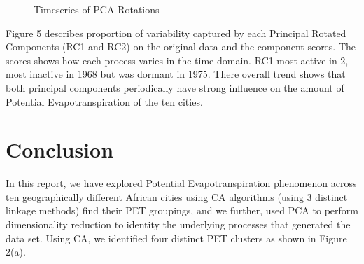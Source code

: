 \documentclass[12pt,a4paper]{article}
\begin{document}
\begin{figure}[t!ph]
\caption{Timeseries of PCA Rotations} \label{fig2}
\end{figure}
Figure 5  describes proportion of variability captured by each Principal  Rotated Components (RC1 and RC2) on the
original data and the component scores.  The scores shows how each process varies in the time domain.  RC1 most active in 2, most inactive in 1968 but was dormant in 1975. There overall trend shows that both principal components periodically have strong influence on the amount of Potential Evapotranspiration of the ten cities.
\section{Conclusion}
In this report,  we have explored Potential Evapotranspiration phenomenon across ten geographically different African cities using CA algorithms (using 3 distinct linkage methods) find their PET groupings, and we further,  used PCA to perform dimensionality reduction to identity the underlying processes that generated the data set.   
Using CA,  we identified four distinct PET clusters as shown in  Figure 2(a).
\end{document}
